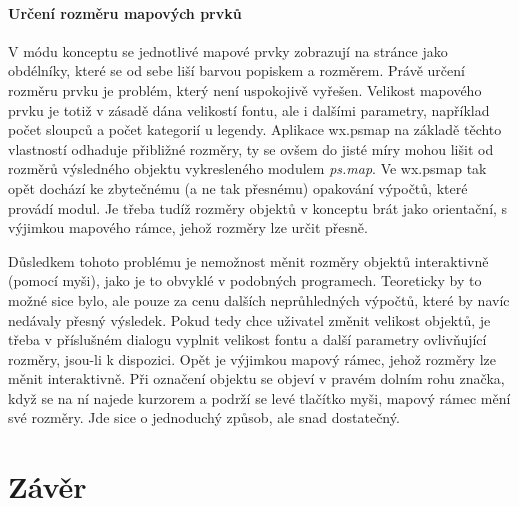 \documentclass[a4paper,12pt,draft]{article}
\newcommand{\modul}[1]{\emph{#1}}
\begin{document}
 \paragraph*{Určení rozměru mapových prvků}
 V módu konceptu se jednotlivé mapové prvky zobrazují na
 stránce jako obdélníky, které se od sebe liší barvou popiskem
 a rozměrem. Právě určení rozměru prvku je problém, který není
 uspokojivě vyřešen. Velikost mapového prvku je totiž v zásadě dána
 velikostí fontu, ale i dalšími parametry, například počet sloupců
 a počet kategorií u legendy. Aplikace wx.psmap na základě těchto
 vlastností odhaduje přibližné rozměry, ty se ovšem do jisté míry
 mohou lišit od rozměrů výsledného objektu vykresleného modulem
 \modul{ps.map}. Ve wx.psmap tak opět dochází ke zbytečnému (a ne
 tak přesnému) opakování výpočtů, které provádí modul. Je třeba
 tudíž rozměry objektů v konceptu brát jako orientační, s výjimkou
 mapového rámce, jehož rozměry lze určit přesně.

 Důsledkem tohoto problému je nemožnost měnit rozměry objektů
 interaktivně (pomocí myši), jako je to obvyklé v podobných
 programech. Teoreticky by to možné sice bylo, ale pouze za cenu
 dalších neprůhledných výpočtů, které by navíc nedávaly přesný
 výsledek. Pokud tedy chce uživatel změnit velikost objektů, je třeba
 v příslušném dialogu vyplnit velikost fontu a další parametry
 ovlivňující rozměry, jsou-li k dispozici. Opět je výjimkou mapový
 rámec, jehož rozměry lze měnit interaktivně. Při označení objektu
 se objeví v pravém dolním rohu značka, když se na ní najede kurzorem a
 podrží se levé tlačítko myši, mapový rámec mění své rozměry. Jde
 sice o jednoduchý způsob, ale snad dostatečný.



\section{Závěr}
\end{document}
